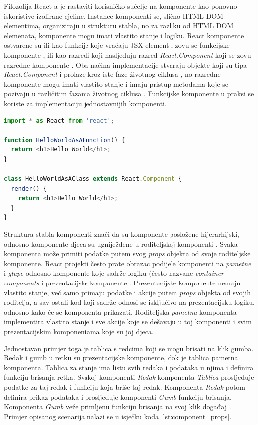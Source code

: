 \documentclass[times, utf8, diplomski, numeric]{fer}
\newcommand{\razmakp}{\vspace{18pt}}
\newcommand{\razmaks}{\vspace{10pt}}
\begin{document}
Filozofija React-a je rastaviti korisničko sučelje na komponente kao ponovno iskoristive izolirane cjeline.
Instance komponenti se, slično HTML DOM elementima, organiziraju u strukturu stabla, no za razliku od HTML DOM elemenata, komponente mogu imati vlastito stanje i logiku. React komponente ostvarene su ili kao funkcije koje vraćaju JSX element i zovu se funkcijske komponente , ili kao razredi koji nasljeđuju razred \emph{React.Component} koji se zovu razredne komponente .
Oba načina implementacije stvaraju objekte koji su tipa \emph{React.Component} i prolaze kroz iste faze životnog ciklusa , no razredne komponente mogu imati vlastito stanje i imaju pristup metodama koje se pozivaju u različitim fazama životnog ciklusa \citep{react_docs}.
Funkcijske komponente u praksi se koriste za implementaciju jednostavnijih komponenti.

\razmakp %
\begin{lstlisting}[language=JavaScript, caption={Primjer funkcijske i razredne komponente}, label={lst:component}]
import * as React from 'react';

function HelloWorldAsAFunction() {
  return <h1>Hello World</h1>;
}

class HelloWorldAsAClass extends React.Component {
  render() {
    return <h1>Hello World</h1>;
  }
}
\end{lstlisting}
\razmaks

Struktura stabla komponenti znači da su komponente posložene hijerarhijski, odnosno komponente djeca  su ugniježđene u roditeljskoj komponenti .
Svaka komponenta može primiti podatke putem svog \emph{props} objekta od svoje roditeljske komponente\citep{react_docs}.
React projekti često prate obrazac podijele komponenti na \emph{pametne} i \emph{glupe} odnosno komponente koje sadrže logiku (često nazvane \emph{container components} i prezentacijske komponente .
Prezentacijske komponente nemaju vlastito stanje, već samo primaju podatke i akcije putem \emph{props} objekta od svojih roditelja, a sav ostali kod koji sadrže odnosi se isključivo na prezentacijsku logiku, odnosno kako će se komponenta prikazati.
Roditeljska \emph{pametna} komponenta implementira vlastito stanje i sve akcije koje se dešavaju u toj komponenti i svim prezentacijskim komponentama koje su joj djeca\citep{med_comp}.

Jednostavan primjer toga je tablica s redcima koji se mogu brisati na klik gumba.
Redak i gumb u retku su prezentacijske komponente, dok je tablica pametna komponenta.
Tablica za stanje ima listu svih redaka i podataka u njima i definira funkciju brisanja retka.
Svakoj komponenti \emph{Redak} komponenta \emph{Tablica} prosljeđuje podatke za taj redak i funkciju koja briše taj redak.
Komponenta \emph{Redak} potom definira prikaz podataka i prosljeđuje komponenti \emph{Gumb} funkciju brisanja.
Komponenta \emph{Gumb} veže primljenu funkciju brisanja na svoj klik događaj .
Primjer opisanog scenarija nalazi se u isječku koda \ref{lst:component_props}.
\end{document}
